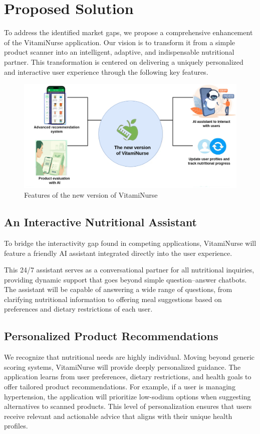  
\section{Proposed Solution}
  
To address the identified market gaps, we propose a comprehensive
enhancement of the VitamiNurse application. Our vision is to transform it from a simple product scanner into an intelligent, adaptive, and
indispensable nutritional partner. This transformation is centered on delivering a uniquely personalized and interactive user experience through
the following key features.

\begin{figure}[H]
\centering
\includegraphics[scale=0.45]{images/new_version_VN.png}
\caption{Features of the new version of VitamiNurse}
\label{fig:VN_new_features}
\end{figure}

\subsection{An Interactive Nutritional Assistant}

To bridge the interactivity gap found in competing applications, VitamiNurse will feature a friendly AI assistant integrated directly into the
user experience.
\par This 24/7 assistant serves as a conversational partner
for all nutritional inquiries, providing dynamic support that goes beyond
simple question–answer chatbots.
The assistant will be capable of answering a wide range of questions,
from clarifying nutritional information to offering meal suggestions based
on preferences and dietary restrictions of each user.

\subsection{Personalized Product Recommendations}
We recognize that nutritional needs are highly individual. Moving beyond
generic scoring systems, VitamiNurse will provide deeply personalized
guidance. The application learns from user preferences, dietary restrictions, and health goals to offer tailored product recommendations.
For example, if a user is managing hypertension, the application will prioritize low-sodium options when suggesting alternatives to scanned products. 
This level of personalization ensures that users receive relevant and actionable advice that aligns with their unique health profiles.

